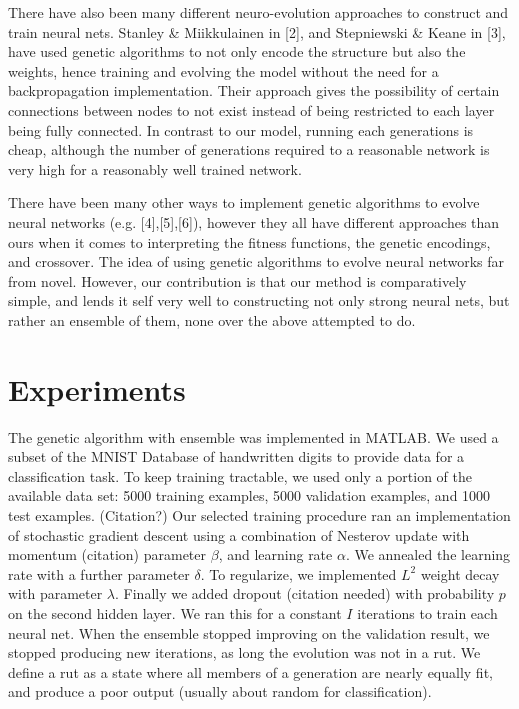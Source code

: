 \documentclass{article}
\DeclareMathOperator{\1}{\mathbbm{1}}
\begin{document}
There have also been many different neuro-evolution approaches to construct and train neural nets. Stanley \&  Miikkulainen in [2], and Stepniewski \& Keane in [3], have used genetic algorithms to not only encode the structure but also the weights, hence training and evolving the model without the need for a backpropagation implementation.  Their approach  gives the possibility of certain connections between nodes to not exist instead of being restricted to each layer being fully connected. In contrast to our model, running each generations is cheap, although the number of generations required to a reasonable network is very high for a reasonably well trained network.

There have been many other ways to implement genetic algorithms to evolve neural networks (e.g. [4],[5],[6]), however they all have different approaches than ours when it comes to interpreting the fitness functions, the genetic encodings, and crossover. The idea of using genetic algorithms to evolve neural networks far from novel. However, our contribution is that our method is comparatively simple, and lends it self very well to constructing not only strong neural nets, but rather an ensemble of them, none over the above attempted to do.

\section{Experiments}
The genetic algorithm with ensemble was implemented in MATLAB. We used a subset of the MNIST Database of handwritten digits
to provide data for a classification task. To keep training tractable, we used only a portion of the available data set:
5000 training examples, 5000 validation examples, and 1000 test examples. (Citation?)
Our selected training procedure ran an implementation of stochastic gradient descent
using a combination of Nesterov update with momentum (citation) parameter $\beta$, and learning rate $\alpha$.
We annealed the learning rate with a further parameter $\delta$. 
To regularize, we implemented $L^2$ weight decay with parameter $\lambda$.
Finally we added dropout (citation needed) with probability $p$ on the second hidden layer.  
We ran this for a constant $I$ iterations to train each neural net. When the ensemble stopped improving on the validation
result, we stopped producing new iterations, as long the evolution was not in a rut. We define a rut as a state where
all members of a generation are nearly equally fit, and produce a poor output (usually about random for classification).
\end{document}
